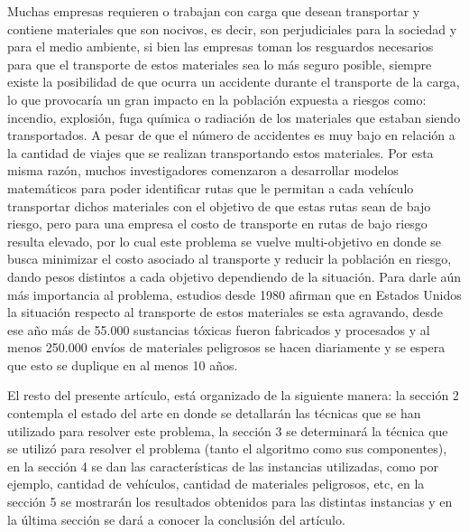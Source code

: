 \documentclass[conference]{IEEEtran}
\begin{document}
Muchas empresas requieren o trabajan con carga que desean transportar y contiene materiales que son nocivos, es decir, son perjudiciales para la sociedad y para el medio ambiente, si bien las empresas toman los resguardos necesarios para que el transporte de estos materiales sea lo m\'as seguro posible, siempre existe la posibilidad \cite{b1} de que ocurra un accidente durante el transporte de la carga, lo que provocar\'ia un gran impacto en la poblaci\'on expuesta a riesgos \cite{b2} como: incendio, explosi\'on, fuga qu\'imica o radiaci\'on  de los materiales que estaban siendo transportados. A pesar de que el n\'umero de accidentes es muy bajo en relaci\'on a la cantidad de viajes que se realizan transportando estos materiales. Por esta misma raz\'on, muchos investigadores comenzaron a desarrollar modelos matem\'aticos para poder identificar rutas que le permitan a cada veh\'iculo transportar dichos materiales con el objetivo de que estas rutas sean de bajo riesgo, pero para una empresa el costo de transporte en rutas de bajo riesgo resulta elevado, por lo cual este problema se vuelve multi-objetivo en donde se busca minimizar el costo asociado al transporte y reducir la poblaci\'on en riesgo, dando pesos distintos a cada objetivo dependiendo de la situaci\'on. Para darle a\'un m\'as importancia al problema, estudios desde 1980 afirman \cite{b3} que en Estados Unidos la situaci\'on respecto al transporte de estos materiales se esta agravando, desde ese a\~no m\'as de 55.000 sustancias t\'oxicas fueron fabricados y procesados y al menos 250.000 env\'ios de materiales peligrosos se hacen diariamente y se espera que esto se duplique en al menos 10 a\~nos.

El resto del presente art\'iculo, est\'a organizado de la siguiente manera: la secci\'on 2 contempla el estado del arte en donde se detallar\'an las t\'ecnicas que se han utilizado para resolver este problema, la secci\'on 3 se determinar\'a la t\'ecnica que se utiliz\'o para resolver el problema (tanto el algoritmo como sus componentes), en la secci\'on 4 se dan las caracter\'isticas de las instancias utilizadas, como por ejemplo, cantidad de veh\'iculos, cantidad de materiales peligrosos, etc, en la secci\'on 5 se mostrar\'an los resultados obtenidos para las distintas instancias y en la \'ultima secci\'on se dar\'a a conocer la conclusi\'on del art\'iculo.
\end{document}
